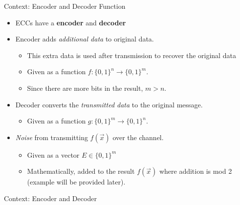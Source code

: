 \documentclass[aspectratio=169]{beamer}
\begin{document}
\begin{frame}{Context: Encoder and Decoder Function}
\begin{itemize}
  \item ECCs have a \textbf{encoder} and \textbf{decoder}
  \item Encoder adds \textit{additional data} to original data.
        \begin{itemize}
            \item This extra data is used after transmission to recover the original data
            \item Given as a function $f: \{0, 1\}^{n} \to \{0, 1\}^{m}$.
            \item Since there are more bits in the result, $m > n$.
          \end{itemize}
    \item Decoder converts the \textit{transmitted data} to the original message.
        \begin{itemize}
            \item Given as a function $g: \{0, 1\}^{m} \to \{0, 1\}^{n}$.
          \end{itemize}
    \item \textit{Noise} from transmitting $f(\vec{x})$ over the channel.
        \begin{itemize}
              \item Given as a vector $E \in \{0, 1\}^{m}$
              \item Mathematically, added to the result $f(\vec{x})$ where addition is mod 2 (example will be provided later).
          \end{itemize}
\end{itemize}
\end{frame}

\begin{frame}{Context: Encoder and Decoder}

\end{frame}
\end{document}
